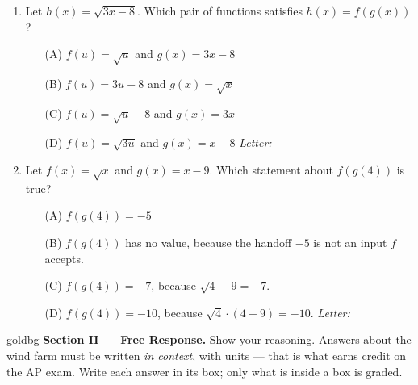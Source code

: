 \documentclass[10pt]{article}
\begin{document}
\begin{enumerate}[leftmargin=1.9em, itemsep=12pt]
\item Let $h(x) = \sqrt{3x - 8}$. Which pair of functions satisfies $h(x) = f(g(x))$?
      \begin{enumerate}[leftmargin=2.6em, itemsep=2pt]
        \item[(A)] $f(u) = \sqrt{u}$ \quad and \quad $g(x) = 3x - 8$
        \item[(B)] $f(u) = 3u - 8$ \quad and \quad $g(x) = \sqrt{x}$
        \item[(C)] $f(u) = \sqrt{u} - 8$ \quad and \quad $g(x) = 3x$
        \item[(D)] $f(u) = \sqrt{3u}$ \quad and \quad $g(x) = x - 8$ \hfill\textit{Letter:}~\gradedblank[id=ap4, type=choice, points=1, answer=A]{0.42in}{13pt}
      \end{enumerate}

\item Let $f(x) = \sqrt{x}$ and $g(x) = x - 9$. Which statement about $f(g(4))$ is true?
      \begin{enumerate}[leftmargin=2.6em, itemsep=2pt]
        \item[(A)] $f(g(4)) = -5$
        \item[(B)] $f(g(4))$ has no value, because the handoff $-5$ is not an input $f$ accepts.
        \item[(C)] $f(g(4)) = -7$, because $\sqrt{4} - 9 = -7$.
        \item[(D)] $f(g(4)) = -10$, because $\sqrt{4} \cdot (4 - 9) = -10$. \hfill\textit{Letter:}~\gradedblank[id=ap5, type=choice, points=1, answer=B]{0.42in}{13pt}
      \end{enumerate}

\end{enumerate}

\newpage

\begin{headlinebox}{goldbg}
\small
\textbf{Section II --- Free Response.} Show your reasoning. Answers about the wind farm must be
written \emph{in context}, with units --- that is what earns credit on the AP exam. Write each answer in its box; only what is inside a box is graded.
\end{headlinebox}

\vspace{0.08in}
\end{document}
